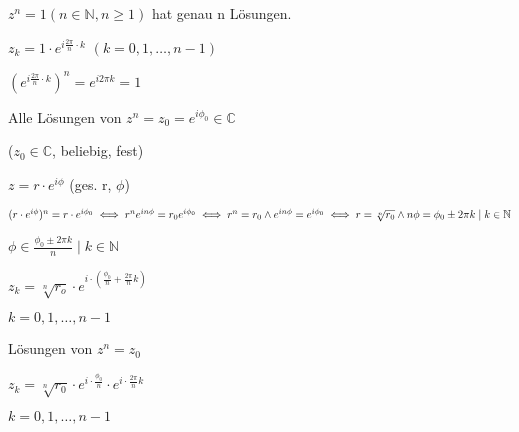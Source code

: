 \documentclass{../tudscript}
\begin{document}
\hypertarget{bemerkung-1}{%
\label{bemerkung-1}}

\(z^n = 1 (n \in \mathbb{N}, n \geq 1)\) hat genau n Lösungen.

\(z_k = 1 \cdot e^{i \frac{2 \pi}{n} \cdot k}\)
\((k = 0, 1, \dotsc, n-1)\)

\hypertarget{probe}{%
\label{probe}}

\((e^{i \frac{2 \pi}{n} \cdot k })^n = e^{i 2 \pi k} = 1\)

\hypertarget{luxf6sen-von-gleichungen-in-mathbbc}{%
\label{luxf6sen-von-gleichungen-in-mathbbc}}

\hypertarget{gesucht}{%
\label{gesucht}}

Alle Lösungen von \(z^n = z_0 = e^{i \phi_{0}} \in \mathbb{C}\)

(\(z_0 \in \mathbb{C}\), beliebig, fest)

\hypertarget{ansatz}{%
\label{ansatz}}

\(z = r \cdot e^{i \phi}\) (ges. r, \(\phi\))

\hypertarget{einsetzen}{%
\label{einsetzen}}

\((r \cdot e^{i \phi})^n = r \cdot e^{i \phi_0} \\ \iff r^n e^{i n \phi} = r_0 e^{i \phi_0} \\ \iff r^n = r_0 \wedge e^{i n \phi} = e^{i \phi_0} \\ \iff r = \sqrt[n]{r_0} \wedge n \phi = \phi_0 \pm 2 \pi k \mid k \in \mathbb{N}\)

\(\phi \in {\frac{\phi_0 \pm 2 \pi k}{n} \mid k \in \mathbb{N}}\)

\hypertarget{luxf6sungen-von-zn-z_0}{%
\label{luxf6sungen-von-zn-z_0}}

\(z_k = \sqrt[n]{r_o} \cdot e^{i \cdot (\frac{\phi_0}{n} + \frac{2 \pi}{n}k)}\)

\(k = {0,1, \dotsc, n-1}\)

\hypertarget{bemerkung-2}{%
\label{bemerkung-2}}

Lösungen von \(z^n = z_0\)

\(z_k = \sqrt[n]{r_0} \cdot e^{i \cdot \frac{\phi_0}{n}} \cdot e^{i \cdot \frac{2 \pi}{n} k}\)

\(k = {0,1, \dotsc, n-1}\)
\end{document}
